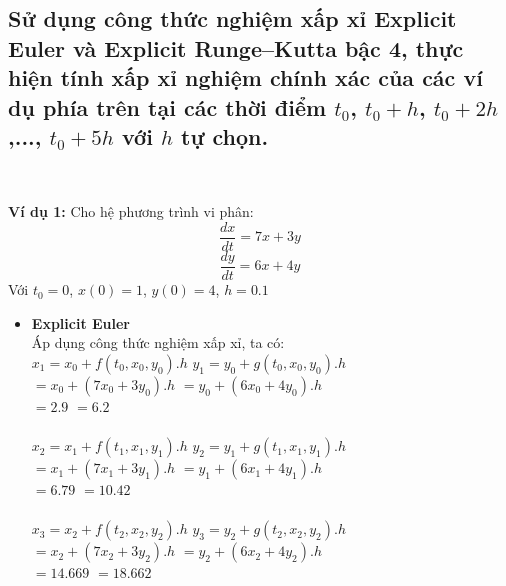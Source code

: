 \documentclass[a4paper]{article}
\begin{document}
\subsection{Sử dụng công thức nghiệm xấp xỉ Explicit Euler và Explicit Runge–Kutta bậc 4, thực hiện tính xấp xỉ nghiệm chính xác của các ví dụ phía trên tại các thời điểm $t_0$, $t_0 + h$, $t_0 + 2h$,..., $t_0 + 5h$ với $h$ tự chọn.} \\
\begin{flushleft}
    \textbf{Ví dụ 1: }
        Cho hệ phương trình vi phân:
            \[\frac{dx}{dt} = 7x + 3y\]
            \[\frac{dy}{dt} = 6x + 4y\]
        Với $t_0 = 0$, $x(0) = 1$, $y(0) = 4$, $h = 0.1$
    \begin{itemize}
        \item \textbf{Explicit Euler \\}
        Áp dụng công thức nghiệm xấp xỉ, ta có: \\
            $x_1=x_0+f(t_0,x_0,y_0).h$ \hspace*{3cm} $y_1=y_0+g(t_0,x_0,y_0).h$ \\
            \hspace*{.34cm} $=x_0+(7x_0+3y_0).h$ \hspace*{3.45cm} $=y_0+(6x_0+4y_0).h$ \\
            \hspace*{.34cm} $=2.9$ \hspace*{5.84cm} $=6.2$ \\
            \\
            $x_2=x_1+f(t_1,x_1,y_1).h$ \hspace*{3cm} $y_2=y_1+g(t_1,x_1,y_1).h$ \\
            \hspace*{.34cm} $=x_1+(7x_1 + 3y_1).h$ \hspace*{3.45cm} $= y_1+(6x_1+4y_1).h$ \\
            \hspace*{.34cm} $=6.79$ \hspace*{5.65cm} $=10.42$\\
            \\
            $x_3=x_2+f(t_2,x_2,y_2).h$ \hspace*{3cm} $y_3=y_2+g(t_2,x_2,y_2).h$ \\
            \hspace*{.34cm} $=x_2+(7x_2 + 3y_2).h$ \hspace*{3.45cm} $=y_2+(6x_2+4y_2).h$ \\
            \hspace*{.34cm} $=14.669$ \hspace*{5.31cm} $=18.662$ \\

\end{itemize}
\end{flushleft}
\end{document}
